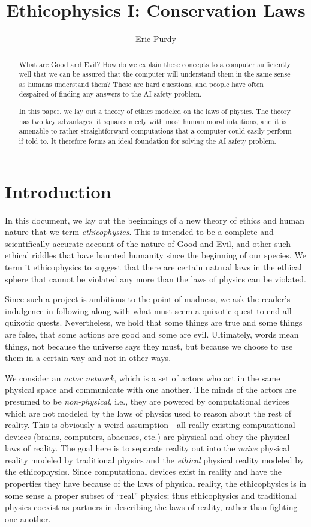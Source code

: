 \documentclass{article}
\title{Ethicophysics I: Conservation Laws}
\author{Eric Purdy}
\begin{document}
\maketitle

\begin{abstract}
What are Good and Evil? How do we explain these concepts to a computer
sufficiently well that we can be assured that the computer will
understand them in the same sense as humans understand them? These are
hard questions, and people have often despaired of finding any answers
to the AI safety problem.

In this paper, we lay out a theory of ethics modeled on the laws of
physics. The theory has two key advantages: it squares nicely with
most human moral intuitions, and it is amenable to rather
straightforward computations that a computer could easily perform if
told to. It therefore forms an ideal foundation for solving the AI
safety problem.
\end{abstract}

\section{Introduction}

In this document, we lay out the beginnings of a new theory of ethics
and human nature that we term {\em ethicophysics}. This is intended to
be a complete and scientifically accurate account of the nature of
Good and Evil, and other such ethical riddles that have haunted
humanity since the beginning of our species. We term it ethicophysics
to suggest that there are certain natural laws in the ethical sphere
that cannot be violated any more than the laws of physics can be
violated.

Since such a project is ambitious to the point of madness, we ask the
reader's indulgence in following along with what must seem a quixotic
quest to end all quixotic quests. Nevertheless, we hold that some
things are true and some things are false, that some actions are good
and some are evil. Ultimately, words mean things, not because the
universe says they must, but because we choose to use them in a
certain way and not in other ways.

We consider an {\em actor network}, which is a set of actors who act
in the same physical space and communicate with one another. The minds
of the actors are presumed to be {\em non-physical}, i.e., they are
powered by computational devices which are not modeled by the laws of
physics used to reason about the rest of reality. This is obviously a
weird assumption - all really existing computational devices (brains,
computers, abacuses, etc.) are physical and obey the physical laws of
reality. The goal here is to separate reality out into the {\em naive}
physical reality modeled by traditional physics and the {\em ethical}
physical reality modeled by the ethicophysics. Since computational
devices exist in reality and have the properties they have because of
the laws of physical reality, the ethicophysics is in some sense a
proper subset of ``real'' physics; thus ethicophysics and traditional
physics coexist as partners in describing the laws of reality, rather
than fighting one another.
\end{document}
